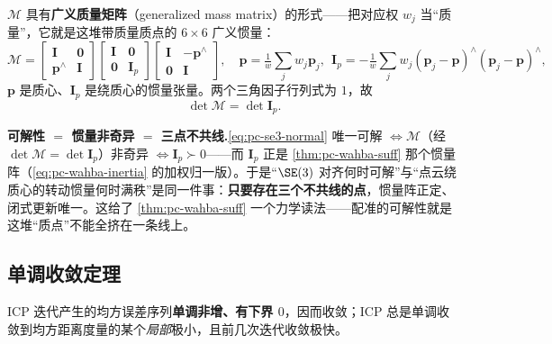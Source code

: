 \begin{insight}
$\boldsymbol{\mathcal{M}}$ 具有\textbf{广义质量矩阵}（generalized mass matrix\cite{murray1994mathematical}）的形式——把对应权 $w_j$ 当“质量”，它就是这堆带质量质点的 $6\times6$ 广义惯量：
\begin{equation}
  \boldsymbol{\mathcal{M}}=\begin{bmatrix}\mathbf{I}&\mathbf{0}\\ \mathbf{p}^\wedge&\mathbf{I}\end{bmatrix}
  \begin{bmatrix}\mathbf{I}&\mathbf{0}\\ \mathbf{0}&\mathbf{I}_p\end{bmatrix}
  \begin{bmatrix}\mathbf{I}&-\mathbf{p}^\wedge\\ \mathbf{0}&\mathbf{I}\end{bmatrix},
  \quad \mathbf{p}=\tfrac1w\textstyle\sum_j w_j\mathbf{p}_j,\ \
  \mathbf{I}_p=-\tfrac1w\textstyle\sum_j w_j(\mathbf{p}_j-\mathbf{p})^\wedge(\mathbf{p}_j-\mathbf{p})^\wedge,
  \label{eq:pc-se3-massmat}
\end{equation}
$\mathbf{p}$ 是质心、$\mathbf{I}_p$ 是绕质心的惯量张量。两个三角因子行列式为 $1$，故
\begin{equation}
  \det\boldsymbol{\mathcal{M}}=\det\mathbf{I}_p.
  \label{eq:pc-se3-detM}
\end{equation}
\end{insight}

\noindent\textbf{可解性 $=$ 惯量非奇异 $=$ 三点不共线.}\;\cref{eq:pc-se3-normal} 唯一可解 $\iff\boldsymbol{\mathcal{M}}$（经 $\det\boldsymbol{\mathcal{M}}=\det\mathbf{I}_p$）非奇异 $\iff\mathbf{I}_p\succ0$——而 $\mathbf{I}_p$ 正是 \cref{thm:pc-wahba-suff} 那个惯量阵（\cref{eq:pc-wahba-inertia} 的加权归一版）。于是“$\SE(3)$ 对齐何时可解”与“点云绕质心的转动惯量何时满秩”是同一件事：\textbf{只要存在三个不共线的点}，惯量阵正定、闭式更新唯一。这给了 \cref{thm:pc-wahba-suff} 一个力学读法——配准的可解性就是这堆“质点”不能全挤在一条线上。

\subsection{单调收敛定理}
\label{sec:pc-icp-convergence}

\begin{theorem}\label{thm:pc-convergence}
ICP 迭代产生的均方误差序列\textbf{单调非增、有下界 $0$}，因而收敛；ICP 总是单调收敛到均方距离度量的某个\emph{局部}极小，且前几次迭代收敛极快\cite{besl1992icp}。
\end{theorem}

